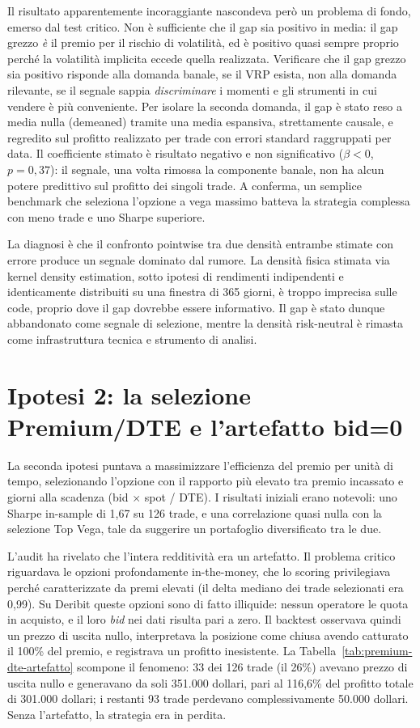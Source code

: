 Il risultato apparentemente incoraggiante nascondeva però un problema di
fondo, emerso dal test critico. Non è sufficiente che il gap sia positivo
in media: il gap grezzo \emph{è} il premio per il rischio di volatilità, ed
è positivo quasi sempre proprio perché la volatilità implicita eccede
quella realizzata. Verificare che il gap grezzo sia positivo risponde alla
domanda banale, se il VRP esista, non alla domanda rilevante, se il segnale
sappia \emph{discriminare} i momenti e gli strumenti in cui vendere è più
conveniente. Per isolare la seconda domanda, il gap è stato reso a media
nulla (demeaned) tramite una media espansiva, strettamente causale, e
regredito sul profitto realizzato per trade con errori standard raggruppati
per data. Il coefficiente stimato è risultato negativo e non
significativo ($\beta < 0$, $p = 0{,}37$): il segnale, una volta rimossa la
componente banale, non ha alcun potere predittivo sul profitto dei singoli
trade. A conferma, un semplice benchmark che seleziona l'opzione a vega
massimo batteva la strategia complessa con meno trade e uno Sharpe
superiore.

La diagnosi è che il confronto pointwise tra due densità entrambe stimate
con errore produce un segnale dominato dal rumore. La densità fisica stimata
via kernel density estimation, sotto ipotesi di rendimenti indipendenti e
identicamente distribuiti su una finestra di 365 giorni, è troppo imprecisa
sulle code, proprio dove il gap dovrebbe essere informativo. Il gap è stato
dunque abbandonato come segnale di selezione, mentre la densità risk-neutral
è rimasta come infrastruttura tecnica e strumento di analisi.

\section{Ipotesi 2: la selezione Premium/DTE e l'artefatto bid=0}
\label{sec:percorso-premium-dte}

La seconda ipotesi puntava a massimizzare l'efficienza del premio per unità
di tempo, selezionando l'opzione con il rapporto più elevato tra premio
incassato e giorni alla scadenza (bid $\times$ spot / DTE). I risultati
iniziali erano notevoli: uno Sharpe in-sample di 1,67 su 126 trade, e una
correlazione quasi nulla con la selezione Top Vega, tale da suggerire un
portafoglio diversificato tra le due.

L'audit ha rivelato che l'intera redditività era un artefatto. Il problema
critico riguardava le opzioni profondamente in-the-money, che lo scoring
privilegiava perché caratterizzate da premi elevati (il delta mediano dei
trade selezionati era 0,99). Su Deribit queste opzioni sono di fatto
illiquide: nessun operatore le quota in acquisto, e il loro \emph{bid} nei
dati risulta pari a zero. Il backtest osservava quindi un prezzo di uscita
nullo, interpretava la posizione come chiusa avendo catturato il 100\% del
premio, e registrava un profitto inesistente. La
Tabella~\ref{tab:premium-dte-artefatto} scompone il fenomeno: 33 dei 126
trade (il 26\%) avevano prezzo di uscita nullo e generavano da soli 351.000
dollari, pari al 116,6\% del profitto totale di 301.000 dollari; i restanti
93 trade perdevano complessivamente 50.000 dollari. Senza l'artefatto, la
strategia era in perdita.

